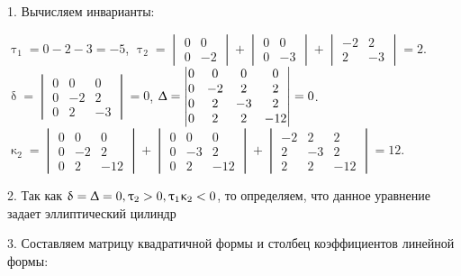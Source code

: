 1. Вычисляем инварианты:
\begin{center}
	$\uptau_1 = 0 - 2 - 3 = -5$,
	$\uptau_2 = \begin{vmatrix}
		  0 & 0\\
		  0 & -2
		\end{vmatrix} + \begin{vmatrix}
		  0 & 0\\
		  0 & -3
		\end{vmatrix} + \begin{vmatrix}
		  -2 & 2\\
		  2 & -3
		\end{vmatrix} = 2$. \\


	$\updelta = \begin{vmatrix}
		  0 & 0 & 0\\
		  0 & -2 & 2\\
		  0 & 2 & -3
		\end{vmatrix} = 0$,
	$\Updelta = \begin{vmatrix}
		  0 & 0 & 0 & 0\\
		  0 & -2 & 2 & 2\\
		  0 & 2 & -3 & 2\\
		  0 & 2 & 2 & -12\\
		\end{vmatrix} = 0$. \\


	$\upkappa_2 = \begin{vmatrix}
		  0 & 0 & 0\\
		  0 & -2 & 2\\
		  0 & 2 & -12
		\end{vmatrix} + \begin{vmatrix}
		  0 & 0 & 0\\
		  0 & -3 & 2\\
		  0 & 2 & -12
		\end{vmatrix} + \begin{vmatrix}
		  -2 & 2 & 2\\
		  2 & -3 & 2\\
		  2 & 2 & -12
		\end{vmatrix} = 12$. \\
\end{center}

2. Так как $\updelta = \Updelta = 0, \uptau_2 > 0,  \uptau_1\upkappa_2 < 0$, то
определяем, что данное уравнение задает эллиптический цилиндр

3. Составляем матрицу квадратичной формы и столбец коэффициентов линейной формы:

